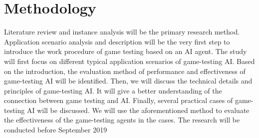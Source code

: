 \documentclass[11pt,en,number]{elegantpaper}
\begin{document}
\section{Methodology}
\noindent
Literature review and instance analysis will be the primary research method. Application scenario analysis and description will be the very first step to introduce the work procedure of game testing based on an AI agent. The study will first focus on different typical application scenarios of game-testing AI. Based on the introduction, the evaluation method of performance and effectiveness of game-testing AI will be identified. Then, we will discuss the technical details and principles of game-testing AI. It will give a better understanding of the connection between game testing and AI. Finally, several practical cases of game-testing AI will be discussed. We will use the aforementioned method to evaluate the effectiveness of the game-testing agents in the cases. 
The research will be conducted before September 2019


\end{document}
